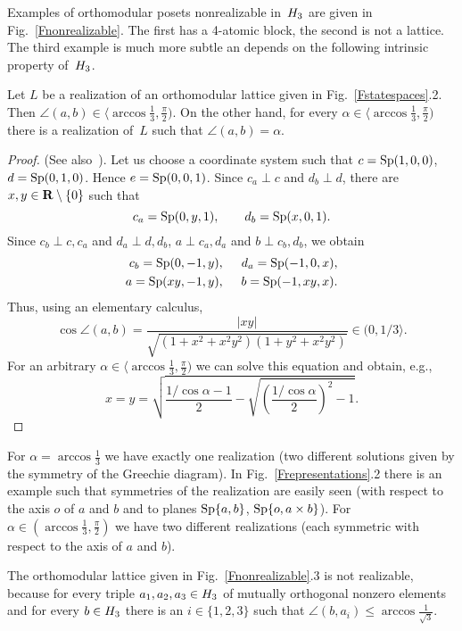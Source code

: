 Examples of orthomodular posets nonrealizable in~$H_3$ are given in
Fig.~\ref{Fnonrealizable}. The first has a 4-atomic block, the second is not
a lattice. The third example is much more subtle an depends on the following
intrinsic property of~$H_3$.


\begin {lemma}  \label {realizabilityoflogic}
Let $L$ be a realization of an orthomodular lattice given in
Fig.~\ref{Fstatespaces}.2. Then $\angle (a,b) \in \langle \arccos \frac 13,
\frac \pi 2)$. On the other hand, for every $\alpha \in \langle \arccos
\frac 13, \frac \pi 2)$ there is a realization of~$L$ such that $\angle
(a,b) = \alpha$.
\end {lemma}


\begin {proof}
(See also~\cite{Kochen-Specker}). Let us choose a coordinate system such
that $c = {\rm Sp} (1,0,0)$, $d = {\rm Sp} (0,1,0)$. Hence $e = {\rm Sp} (0,0,1)$. Since
$c_a \perp c$ and $d_b \perp d$, there are $x,y \in {\bf R} \setminus \{0\}$ such that
  $$
  c_a = {\rm Sp} (0,y,1), \qquad
  d_b = {\rm Sp} (x,0,1).
  $$
Since $c_b \perp c,c_a$ and $d_a \perp d,d_b$, $a \perp c_a,d_a$ and $b \perp
c_b,d_b$, we obtain
  \begin {eqnarray*}
  c_b = {\rm Sp} (0,-1,y), &\enspace&
  d_a = {\rm Sp} (-1,0,x), \\
  a   = {\rm Sp} (xy,-1,y), &\enspace&
  b   = {\rm Sp} (-1,xy,x).
  \end {eqnarray*}
Thus, using an elementary calculus,
  $$
  \cos \angle (a,b) = \frac {|xy|}{\sqrt {(1+x^2+x^2y^2)(1+y^2+x^2y^2)}}
    \in (0, 1/3 \rangle.
  $$
For an arbitrary $\alpha \in \langle \arccos \frac 13, \frac \pi2)$ we can
solve this equation and obtain, e.g.,
  $$
  x = y = \sqrt { \frac {1/\cos\alpha-1}{2} -
             \sqrt {\left( \frac {1/\cos\alpha}{2} \right)^2-1}}.
  $$
\end {proof}



For $\alpha = \arccos \frac 13$ we have exactly one realization (two
different solutions given by the symmetry of the Greechie diagram). In
Fig.~\ref{Frepresentations}.2 there is an example such that symmetries of
the realization are easily seen (with respect to the axis $o$ of $a$ and $b$
and to planes ${\rm Sp}\{a,b\}$, ${\rm Sp}\{o,a\times b\}$). For $\alpha \in
(\arccos \frac 13, \frac \pi2)$ we have two different realizations (each
symmetric with respect to the axis of $a$ and $b$).

The orthomodular lattice given in Fig.~\ref{Fnonrealizable}.3 is not
realizable, because for every triple $a_1,a_2,a_3 \in H_3$ of mutually
orthogonal nonzero elements and for every $b \in H_3$ there is an $i \in
\{1,2,3\}$ such that $\angle (b,a_i) \le \arccos \frac 1{\sqrt 3}$.

